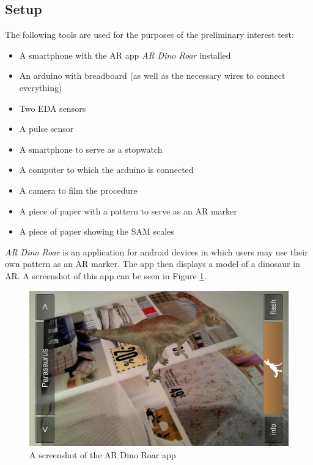 \pagebreak

\subsection{Setup}
The following tools are used for the purposes of the preliminary interest test:

\begin{itemize}
    \item A smartphone with the AR app \textit{AR Dino Roar} installed
    \item An arduino with breadboard (as well as the necessary wires to connect everything)
    \item Two EDA sensors
    \item A pulse sensor
    \item A smartphone to serve as a stopwatch
    \item A computer to which the arduino is connected
    \item A camera to film the procedure
    \item A piece of paper with a pattern to serve as an AR marker
    \item A piece of paper showing the SAM scales
\end{itemize}

\textit{AR Dino Roar} is an application for android devices in which users may use their own pattern as an AR marker. The app then displays a model of a dinosaur in AR. A screenshot of this app can be seen in Figure \ref{fig:dino}.

\begin{figure}[h!]
	\centering
    \includegraphics[scale=0.5]{figures/AR_dino.png}
    \caption{A screenshot of the AR Dino Roar app \cite{ARDino}}\label{fig:dino}
\end{figure}

